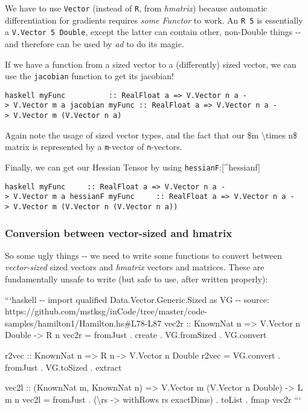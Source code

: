 \documentclass[]{article}
\begin{document}
We have to use \texttt{Vector} (instead of \texttt{R}, from \emph{hmatrix})
because automatic differentiation for gradients requires \emph{some Functor} to
work. An \texttt{R\ 5} is essentially a \texttt{V.Vector\ 5\ Double}, except the
latter can contain other, non-Double things -\/- and therefore can be used by
\emph{ad} to do its magic.

If we have a function from a sized vector to a (differently) sized vector, we
can use the \texttt{jacobian} function to get its jacobian!

\texttt{haskell\ myFunc\ \ \ \ \ \ \ \ \ \ ::\ RealFloat\ a\ =\textgreater{}\ V.Vector\ n\ a\ -\textgreater{}\ V.Vector\ m\ a\ jacobian\ myFunc\ ::\ RealFloat\ a\ =\textgreater{}\ V.Vector\ n\ a\ -\textgreater{}\ V.Vector\ m\ (V.Vector\ n\ a)}

Again note the usage of sized vector types, and the fact that our \$m
\textbackslash{}times n\$ matrix is represented by a \texttt{m}-vector of
\texttt{n}-vectors.

Finally, we can get our Hessian Tensor by using
\texttt{hessianF}:{[}\^{}hessianf{]}

\texttt{haskell\ myFunc\ \ \ \ \ ::\ RealFloat\ a\ =\textgreater{}\ V.Vector\ n\ a\ -\textgreater{}\ V.Vector\ m\ a\ hessianF\ myFunc\ \ \ \ \ ::\ RealFloat\ a\ =\textgreater{}\ V.Vector\ n\ a\ -\textgreater{}\ V.Vector\ m\ (V.Vector\ n\ (V.Vector\ n\ a))}

\subsubsection{Conversion between vector-sized and hmatrix}

So some ugly things -\/- we need to write some functions to convert between
\emph{vector-sized} sized vectors and \emph{hmatrix} vectors and matrices. These
are fundamentally unsafe to write (but safe to use, after written properly):

```haskell -\/- import qualified Data.Vector.Generic.Sized as VG -\/- source:
https://github.com/mstksg/inCode/tree/master/code-samples/hamilton1/Hamilton.hs\#L78-L87
vec2r :: KnownNat n =\textgreater{} V.Vector n Double -\textgreater{} R n vec2r
= fromJust . create . VG.fromSized . VG.convert

r2vec :: KnownNat n =\textgreater{} R n -\textgreater{} V.Vector n Double r2vec
= VG.convert . fromJust . VG.toSized . extract

vec2l :: (KnownNat m, KnownNat n) =\textgreater{} V.Vector m (V.Vector n Double)
-\textgreater{} L m n vec2l = fromJust . (\textbackslash{}rs -\textgreater{}
withRows rs exactDims) . toList . fmap vec2r ```
\end{document}
